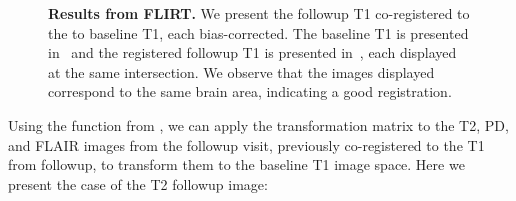 \begin{figure}
\hfill
\caption{{\bf Results from FLIRT.} We present the followup T1 co-registered to the to baseline T1, each bias-corrected.  The baseline T1 is presented in~\protect{} and the registered followup T1 is presented in~\protect{}, each displayed at the same intersection. We observe that the images displayed correspond to the same brain area, indicating a good registration. }
\label{fig:flirt}
\end{figure}


Using the  function from , we can apply the transformation matrix to the T2, PD, and FLAIR images from the followup visit, previously co-registered to the T1 from followup, to transform them to the baseline T1 image space.  Here we present the case of the T2 followup image:


\begin{knitrout}
\color{fgcolor}\begin{kframe}
\begin{alltt}
\hlstd{(} \hlstd{=} \hlstd{,} 
             \hlstd{=} \hlstd{,} 
             \hlstd{=} \hlstd{,} 
             \hlstd{=}  
            \hlstd{)}
\end{alltt}
\end{kframe}
\end{knitrout}




